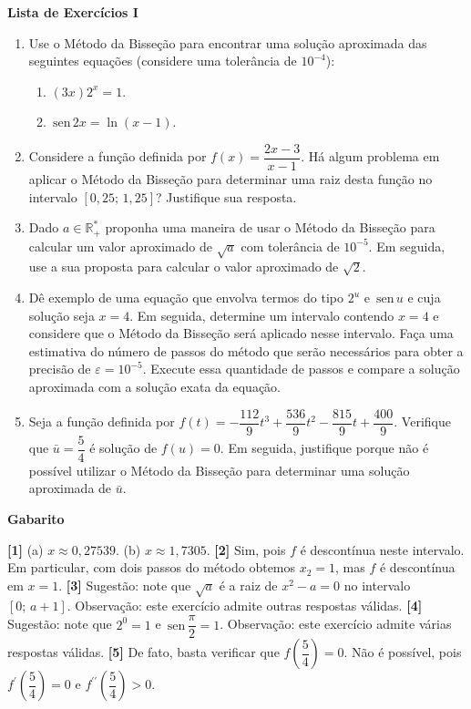 \documentclass[12pt,a4paper]{article}
\newcommand{\sen}{\,\textrm{sen}\,}
\begin{document}
\begin{center}
 \textbf{Lista de Exercícios I}
\end{center}

\begin{enumerate}
\item Use o Método da Bisseção para encontrar uma solução aproximada das seguintes equações (considere uma tolerância de $10^{-4}$):
 \begin{enumerate}
  \item $(3x)2^x = 1$. 
  \item $\sen 2x = \ln (x - 1)$.
 \end{enumerate}

 \item Considere a função definida por $f(x) = \dfrac{2x - 3}{x-1}$. Há algum problema em aplicar o Método da Bisseção para determinar uma raiz desta função no intervalo $[0,25;\,1,25]$? Justifique sua resposta.

 \item Dado $a\in\mathbb{R}_+^*$ proponha uma maneira de usar o Método da Bisseção para calcular um valor aproximado de $\sqrt{a}$ com tolerância de $10^{-5}$. Em seguida, use a sua 
proposta para calcular o valor aproximado de $\sqrt{2}$.

 \item Dê exemplo de uma equação que envolva termos do tipo $2^u$ e $\sen u$ e cuja solução seja $x = 4$. Em seguida, determine um intervalo 
contendo $x = 4$ e considere que o Método da Bisseção será aplicado nesse intervalo. Faça uma estimativa do número de passos do método que 
serão necessários para obter a precisão de $\varepsilon = 10^{-5}$. Execute essa quantidade de passos e compare a solução aproximada com a solução 
exata da equação.

 \item Seja a função definida por $f(t) =  -\dfrac{112}{9}t^3 + \dfrac{536}{9}t^2 -\dfrac{815}{9}t + \dfrac{400}{9}$. Verifique que $\bar{u} = \dfrac{5}{4}$ é solução de $f(u) = 0$. 
Em seguida, justifique porque não é possível utilizar o Método da Bisseção para determinar uma solução aproximada de $\bar{u}$.

\end{enumerate}

\begin{center}
\textbf{Gabarito}
\end{center}
\textbf{[1]} (a) $x\approx 0,27539$. (b) $x\approx 1,7305$. 
\textbf{[2]} Sim, pois $f$ é descontínua neste intervalo. Em particular, com dois passos do método obtemos $x_2 = 1$, mas $f$ é descontínua em $x = 1$. 
\textbf{[3]} Sugestão: note que $\sqrt{a}$ é a raiz de $x^2 - a = 0$ no intervalo $[0;\,a+1]$. Observação: este exercício admite outras respostas válidas. 
\textbf{[4]} Sugestão: note que $2^0 = 1$ e $\sen\dfrac{\pi}{2} = 1$. Observação: este exercício admite várias respostas válidas.
\textbf{[5]} De fato, basta verificar que $f\left(\dfrac{5}{4}\right) = 0$. Não é possível, pois $f^\prime\left(\dfrac{5}{4}\right) = 0$ e 
$f^{\prime\prime}\left(\dfrac{5}{4}\right) > 0$.
\end{document}
